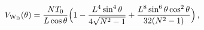 \begin{equation}
V_{\rm W_B}(\theta)=\frac{NT_0}{L\cos{\theta}}\Bigl(1-\frac{L^4\sin^4{\theta}}
{4\sqrt{N^2-1}}+\frac{L^8\sin^6{\theta}\cos^2{\theta}}{32(N^2-1)}\Bigr)\, ,
\end{equation}

